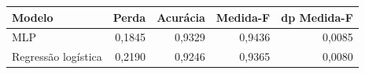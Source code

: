\begin{tabular}{lrrrr}
\toprule
Modelo & Perda & Acurácia & Medida-F & dp Medida-F \\
\midrule
MLP & 0,1845 & 0,9329 & 0,9436 & 0,0085 \\
Regressão logística & 0,2190 & 0,9246 & 0,9365 & 0,0080 \\
\bottomrule
\end{tabular}
